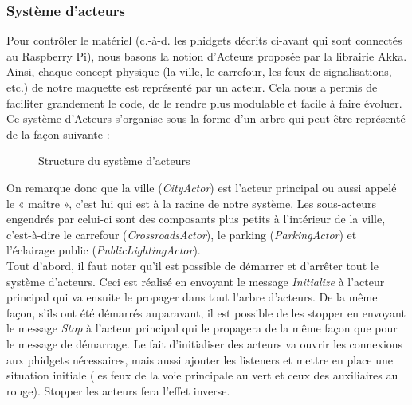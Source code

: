 \subsubsection{Système d'acteurs}\label{systeme-acteurs}
Pour contrôler le matériel (c.-à-d. les phidgets décrits ci-avant qui sont connectés au Raspberry Pi), nous basons la notion d’Acteurs proposée par la librairie Akka. Ainsi, chaque concept physique (la ville, le carrefour, les feux de signalisations, etc.) de notre maquette est représenté par un acteur. Cela nous a permis de faciliter grandement le code, de le rendre plus modulable et facile à faire évoluer.
Ce système d’Acteurs s’organise sous la forme d’un arbre qui peut être représenté de la façon suivante :
\begin{figure}[H]
    \begin{center}

        \caption{Structure du système d'acteurs}
    \end{center}
\end{figure}
On remarque donc que la ville (\emph{CityActor}) est l’acteur principal ou aussi appelé le « maître », c’est lui qui est à la racine de notre système. Les sous-acteurs engendrés par celui-ci sont des composants plus petits à l’intérieur de la ville, c’est-à-dire le carrefour (\emph{CrossroadsActor}), le parking (\emph{ParkingActor}) et l’éclairage public (\emph{PublicLightingActor}).\\

Tout d’abord, il faut noter qu’il est possible de démarrer et d’arrêter tout le système d’acteurs. Ceci est réalisé en envoyant le message \emph{Initialize} à l’acteur principal qui va ensuite le propager dans tout l’arbre d’acteurs. De la même façon, s'ils ont été démarrés auparavant, il est possible de les stopper en envoyant le message \emph{Stop} à l’acteur principal qui le propagera de la même façon que pour le message de démarrage. Le fait d’initialiser des acteurs va ouvrir les connexions aux phidgets nécessaires, mais aussi ajouter les listeners et mettre en place une situation initiale (les feux de la voie principale au vert et ceux des auxiliaires au rouge). Stopper les acteurs fera l’effet inverse.\\

